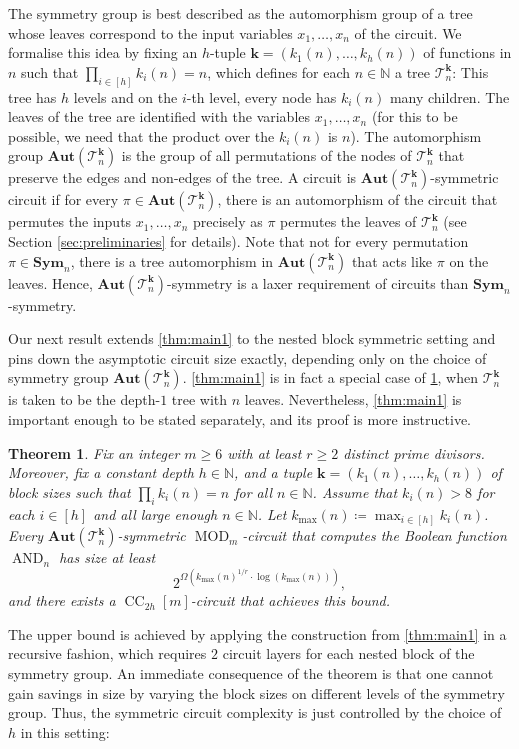 \documentclass[11pt]{article}
\DeclareMathOperator{\MOD}{MOD}
\DeclareMathOperator{\AND}{AND}
\newcommand{\Aut}{\mathbf{Aut}}
\newcommand{\Sym}{\mathbf{Sym}}
\newcommand{\bbN}{\mathbb{N}}
\newcommand{\Tt}{{\mathcal T}}
\theoremstyle{definition}
\theoremstyle{plain}
\newtheorem{theorem}[definition]{Theorem}
\theoremstyle{remark}
\theoremstyle{remark}
\DeclareMathOperator{\CC}{CC}
\begin{document}
The symmetry group is best described as the automorphism group of a tree whose leaves correspond to the input variables $x_1, \dots, x_n$ of the circuit. 
We formalise this idea by fixing an $h$-tuple $\boldsymbol{k} = (k_1(n), \dots, k_h(n))$ of functions in $n$ such that $\prod_{i \in [h]} k_i(n) = n$, which defines for each $n \in \bbN$ a tree $\Tt_n^{\boldsymbol{k}}$: This tree has $h$ levels and on the $i$-th level, every node has $k_i(n)$ many children. The leaves of the tree are identified with the variables $x_1, \dots, x_n$ (for this to be possible, we need that the product over the $k_i(n)$ is $n$). The automorphism group $\Aut(\Tt_n^{\boldsymbol{k}})$ is the group of all permutations of the nodes of $\Tt_n^{\boldsymbol{k}}$ that preserve the edges and non-edges of the tree. 
A circuit is $\Aut(\Tt_n^{\boldsymbol{k}})$-symmetric circuit if for every $\pi \in \Aut(\Tt_n^{\boldsymbol{k}})$, there is an automorphism of the circuit that permutes the inputs $x_1, \dots, x_n$ precisely as $\pi$ permutes the leaves of $\Tt_n^{\boldsymbol{k}}$ (see Section \ref{sec:preliminaries} for details).
Note that not for every permutation $\pi \in \Sym_n$, there is a tree automorphism in $\Aut(\Tt_n^{\boldsymbol{k}})$ that acts like $\pi$ on the leaves. Hence, $\Aut(\Tt_n^{\boldsymbol{k}})$-symmetry is a laxer requirement of circuits than $\Sym_n$-symmetry.

Our next result extends \cref{thm:main1} to the nested block symmetric setting and pins down 
the asymptotic circuit size exactly, depending only on the choice of symmetry group $\Aut(\Tt_n^{\boldsymbol{k}})$. 
\cref{thm:main1} is in fact a special case of \cref{thm:main2}, when $\Tt_n^{\boldsymbol k}$ is taken to be the depth-$1$ tree with $n$ leaves. Nevertheless, \cref{thm:main1} is important enough to be stated separately, and its proof is more instructive.
\begin{theorem}
	\label{thm:main2}
	Fix an integer $m \geq 6$ with at least $r \geq 2$ distinct prime divisors.
	Moreover, fix a constant depth $h \in \bbN$, and a tuple $\boldsymbol{k} = (k_1(n), \dots, k_h(n))$ of block sizes such that $\prod_i k_i(n) =n$ for all $n \in \bbN$. Assume that $k_i(n) > 8$ for each $i \in [h]$ and all large enough $n \in \bbN$.
	Let $k_{\text{max}}(n) \coloneqq \max_{i \in [h]} k_i(n)$.\\
	Every $\Aut(\Tt_n^{\boldsymbol k})$-symmetric $\MOD_m$-circuit that computes the Boolean function $\AND_n$ has size at least 
	\[
	2^{\Omega(k_{\text{max}}(n)^{1/r} \cdot \log(k_{\text{max}}(n)))},
	\]
	and there exists a $\CC_{2h}[m]$-circuit that achieves this bound.
\end{theorem}	
The upper bound is achieved by applying the construction from \cref{thm:main1} in a recursive fashion, which requires $2$ circuit layers for each nested block of the symmetry group. An immediate consequence of the theorem is that one cannot gain savings in size by varying the block sizes on different levels of the symmetry group. Thus, the symmetric circuit complexity is just controlled by the choice of $h$ in this setting:
\end{document}
